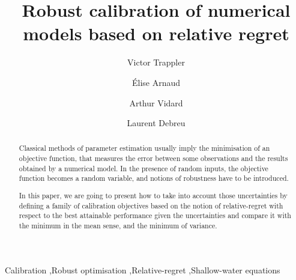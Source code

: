 \documentclass[preprint, review, 1p]{elsarticle}
\begin{document}
\begin{frontmatter}

\title{Robust calibration of numerical models based on relative regret}%

\author[1]{Victor {Trappler}}
\author[1]{Élise {Arnaud}}
\author[1]{Arthur {Vidard}}
\author[1]{Laurent {Debreu}}


\address[1]{Univ. Grenoble Alpes, Inria, CNRS, Grenoble INP\textsuperscript{1}, LJK, 38000 Grenoble, France}

\begin{abstract}
Classical methods of parameter estimation usually imply the minimisation of an objective function, that measures the error between some observations and the results obtained by a numerical model. In the presence of random inputs, the objective function becomes a random variable, and notions of robustness have to be introduced.

In this paper, we are going to present how to take into account those uncertainties by defining a family of calibration objectives based on the notion of relative-regret with respect to the best attainable performance given the uncertainties and compare it with the minimum in the mean sense, and the minimum of variance.
\end{abstract}



\begin{keyword}
Calibration \sep Robust optimisation \sep Relative-regret \sep Shallow-water equations


\end{keyword}

\end{frontmatter}
\end{document}
